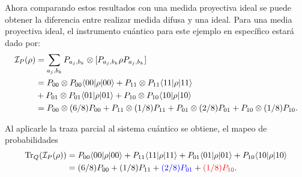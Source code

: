 \begin{comment}
Luego al realizar la traza parcial sobre el sistema apuntador  o clásico se obtiene el efecto de la medición sobre el estado de entrada,
\begin{equation}\label{traza_A2_ejemplo1}
    \begin{split}
        \tr_C(\mathcal{I}_2(\rho)) &= P_{00} \rho P_{00} + P_{11}\rho P_{11}+ P_{01}\rho P_{01}+ P_{10}\rho P_{10}\\
        &=(6/8)P_{00} + (1/8)P_{11}+(2/8)P_{01} + (1/8)P_{10}.\\
    \end{split}
\end{equation}
\end{comment} 



Ahora comparando estos resultados con una medida proyectiva ideal se puede obtener la diferencia entre realizar medida difusa y una ideal. Para una media proyectiva ideal, el instrumento cuántico para este ejemplo en específico estará dado por: \begin{equation}\label{proyectiva_ideal_ejemplo}
    \begin{split}
        \mathcal{I}_P(\rho)&=\sum_{a_j,b_k}P_{a_j,b_k}\otimes[P_{a_j,b_k}\rho P_{a_j,b_k}]\\
        &=P_{00}\otimes P_{00} \langle 00|\rho|00\rangle + P_{11}\otimes P_{11} \langle 11|\rho|11\rangle\\
        &+P_{01} \otimes P_{01}\langle 01|\rho|01\rangle +P_{10} \otimes P_{10} \langle 10|\rho|10\rangle\\
        &=P_{00}\otimes (6/8)P_{00} + P_{11}\otimes (1/8)P_{11}+P_{01} \otimes (2/8)P_{01} +P_{10} \otimes (1/8)P_{10}.\\
    \end{split}
\end{equation}


Al aplicarle la traza parcial al sistema cuántico se obtiene, el mapeo de probabilidades \begin{equation}\label{traza_SP_ejemplo1}
    \begin{split}
        {\rm Tr}_Q(\mathcal{I}_P(\rho)) &= P_{00} \langle 00|\rho|00\rangle + P_{11} \langle 11|\rho|11\rangle+P_{01}\langle 01|\rho|01\rangle +P_{10} \langle 10|\rho|10\rangle\\
        &=(6/8)P_{00} + (1/8)P_{11}+{\color{blue}(2/8)P_{01}} + {\color{red}(1/8)P_{10}}.\\
    \end{split}
\end{equation}

